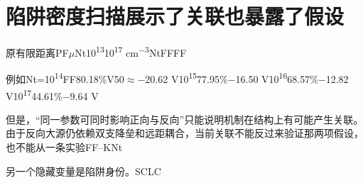 \section{{\cjkfont 陷阱密度扫描展示了关联也暴露了假设}\allowbreak{}}\label{sec:26}
{\cjkfont 原有限距离}\allowbreak{}PF\allowbreak{}\ensuremath{\mu}\allowbreak{}Nt\allowbreak{}10\textsuperscript{13}\allowbreak{}10\textsuperscript{17} cm\textsuperscript{−3}\allowbreak{}Nt\allowbreak{}FF\allowbreak{}FF\allowbreak{}
\par
{\cjkfont 例如}\allowbreak{}Nt=\allowbreak{}10\textsuperscript{14}\allowbreak{}FF\allowbreak{}80.18\%\allowbreak{}V50\ensuremath{\approx}\allowbreak{}−20.62 V\allowbreak{}10\textsuperscript{15}\allowbreak{}77.95\%\allowbreak{}−16.50 V\allowbreak{}10\textsuperscript{16}\allowbreak{}68.57\%\allowbreak{}−12.82 V\allowbreak{}10\textsuperscript{17}\allowbreak{}44.61\%\allowbreak{}−9.64 V\allowbreak{}
\par
{\cjkfont 但是，“同一参数可同时影响正向与反向”只能说明机制在结构上有可能产生关联。由于反向大源仍依赖双支降垒和远距耦合，当前关联不能反过来验证那两项假设，也不能从一条实验}\allowbreak{}FF–K\allowbreak{}Nt\allowbreak{}
\par
{\cjkfont 另一个隐藏变量是陷阱身份。}\allowbreak{}SCLC\allowbreak{}
\par
